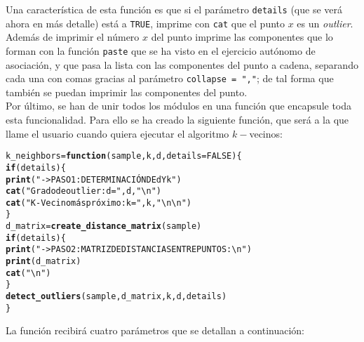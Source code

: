 \documentclass[12pt]{report}\usepackage[]{graphicx}\usepackage[dvipsnames]{xcolor}
\makeatletter
\newcommand{\hlnum}[1]{\textcolor[rgb]{0.686,0.059,0.569}{#1}}%
\newcommand{\hlstr}[1]{\textcolor[rgb]{0.192,0.494,0.8}{#1}}%
\newcommand{\hlstd}[1]{\textcolor[rgb]{0.345,0.345,0.345}{#1}}%
\newcommand{\hlkwa}[1]{\textcolor[rgb]{0.161,0.373,0.58}{\textbf{#1}}}%
\newcommand{\hlkwb}[1]{\textcolor[rgb]{0.69,0.353,0.396}{#1}}%
\newcommand{\hlkwc}[1]{\textcolor[rgb]{0.333,0.667,0.333}{#1}}%
\newcommand{\hlkwd}[1]{\textcolor[rgb]{0.737,0.353,0.396}{\textbf{#1}}}%
\newenvironment{kframe}{%
 \def\at@end@of@kframe{}%
 \ifinner\ifhmode%
  \def\at@end@of@kframe{\end{minipage}}%
  \begin{minipage}{\columnwidth}%
 \fi\fi%
 \def\FrameCommand##1{\hskip\@totalleftmargin \hskip-\fboxsep
 \colorbox{shadecolor}{##1}\hskip-\fboxsep
     \hskip-\linewidth \hskip-\@totalleftmargin \hskip\columnwidth}%
 \MakeFramed {\advance\hsize-\width
   \@totalleftmargin\z@ \linewidth\hsize
   \@setminipage}}%
 {\par\unskip\endMakeFramed%
 \at@end@of@kframe}
\newenvironment{knitrout}{}{} %
\makeatother
\begin{document}
					Una característica de esta función es que si el parámetro \texttt{details} (que se verá ahora en más detalle) está a \texttt{TRUE}, imprime con \texttt{cat} que el punto $x$ es un \textit{outlier}. Además de imprimir el número $x$ del punto imprime las componentes que lo forman con la función \texttt{paste} que se ha visto en el ejercicio autónomo de asociación, y que pasa la lista con las componentes del punto a cadena, separando cada una con comas gracias al parámetro \texttt{collapse = ","}; de tal forma que también se puedan imprimir las componentes del punto.\\
					
					Por último, se han de unir todos los módulos en una función que encapsule toda esta funcionalidad. Para ello se ha creado la siguiente función, que será a la que llame el usuario cuando quiera ejecutar el algoritmo $k-$vecinos:
					
\begin{knitrout}
\color{fgcolor}\begin{kframe}
\begin{alltt}
\hlstd{k_neighbors} \hlkwb{=} \hlkwa{function}\hlstd{(}\hlkwc{sample}\hlstd{,} \hlkwc{k}\hlstd{,} \hlkwc{d}\hlstd{,} \hlkwc{details} \hlstd{=} \hlnum{FALSE}\hlstd{) \{}
        \hlkwa{if}\hlstd{(details) \{}
                \hlkwd{print}\hlstd{(}\hlstr{"->PASO 1: DETERMINACIÓN DE d Y k"}\hlstd{)}
                \hlkwd{cat}\hlstd{(}\hlstr{"Grado de outlier: d ="}\hlstd{,d,}\hlstr{"\textbackslash{}n"}\hlstd{)}
                \hlkwd{cat}\hlstd{(}\hlstr{"K-Vecino más próximo: k ="}\hlstd{,k,}\hlstr{"\textbackslash{}n\textbackslash{}n"}\hlstd{)}
        \hlstd{\}}
        \hlstd{d_matrix} \hlkwb{=} \hlkwd{create_distance_matrix}\hlstd{(sample)}
        \hlkwa{if}\hlstd{(details) \{}
                \hlkwd{print}\hlstd{(}\hlstr{"->PASO 2: MATRIZ DE DISTANCIAS ENTRE PUNTOS:\textbackslash{}n"}\hlstd{)}
                \hlkwd{print}\hlstd{(d_matrix)}
                \hlkwd{cat}\hlstd{(}\hlstr{"\textbackslash{}n"}\hlstd{)}
        \hlstd{\}}
        \hlkwd{detect_outliers}\hlstd{(sample, d_matrix, k, d, details)}
\hlstd{\}}
\end{alltt}
\end{kframe}
\end{knitrout}
					
					La función recibirá cuatro parámetros que se detallan a continuación:
					
\end{document}
